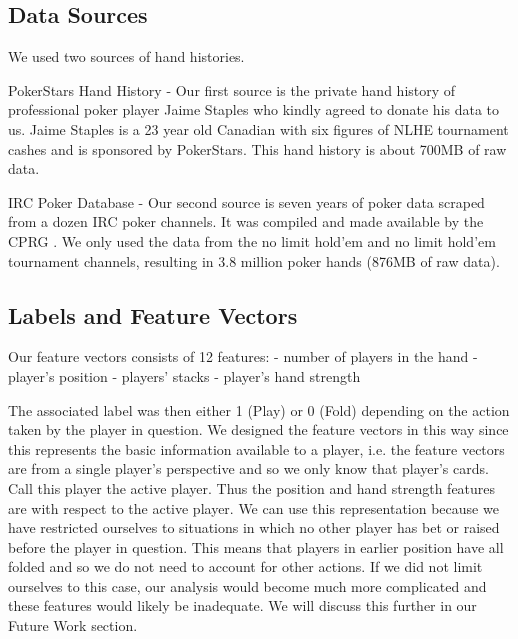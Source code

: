 \documentclass[twoside]{article}
\begin{document}
\begin{multicols}{2}
\subsection{Data Sources}
We used two sources of hand histories.
\begin{compactitem}
\item{PokerStars Hand History} - Our first source is the private hand history of professional poker player Jaime Staples who kindly agreed to donate his data to us. Jaime Staples is a 23 year old Canadian with six figures of NLHE tournament cashes \cite{JaimeStaples} and is sponsored by PokerStars. This hand history is about 700MB of raw data.
\item{IRC Poker Database} - Our second source is seven years of poker data scraped from a dozen IRC poker channels. It was compiled and made available by the CPRG \cite{IRCDatabase}. 
We only used the data from the no limit hold'em and  no limit hold'em tournament channels, resulting in 3.8 million poker hands (876MB of raw data). 
\end{compactitem}

\subsection{Labels and Feature Vectors}

Our feature vectors consists of 12 features: \newline
\indent - number of players in the hand\newline
\indent - player's position \newline
\indent - players' stacks \newline
\indent - player's hand strength \newline

The associated label was then either 1 (Play) or 0 (Fold) depending on the action taken by the player in question. We designed the feature vectors in this way since this represents the basic information available to a player, i.e. the feature vectors are from a single player's perspective and so we only know that player's cards. Call this player the active player. Thus the position and hand strength features are with respect to the active player. We can use this representation because we have restricted ourselves to situations in which no other player has bet or raised before the player in question. This means that players in earlier position have all folded and so we do not need to account for other actions. If we did not limit ourselves to this case, our analysis would become much more complicated and these features would likely be inadequate. We will discuss this further in our Future Work section.


\end{multicols}
\end{document}
